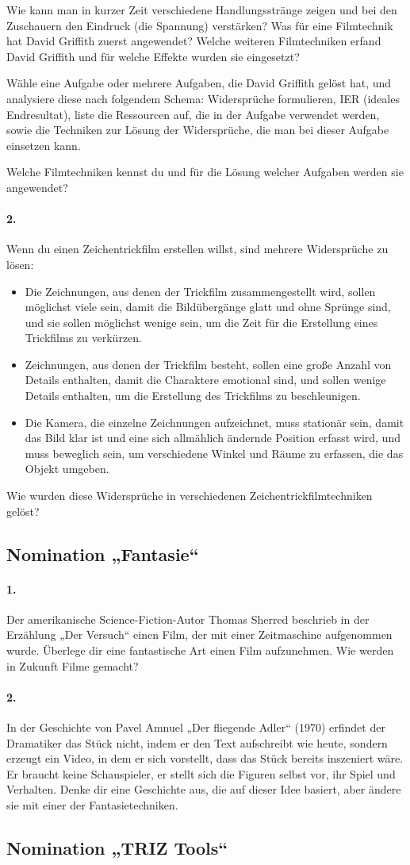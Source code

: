 \documentclass[11pt,a4paper]{article}
\newcommand{\contradictions}{
Wenn du einen Zeichentrickfilm erstellen willst, sind mehrere Widersprüche zu
lösen:
\begin {itemize}
\item Die Zeichnungen, aus denen der Trickfilm zusammengestellt wird, sollen
  möglichst viele sein, damit die Bildübergänge glatt und ohne Sprünge sind,
  und sie sollen möglichst wenige sein, um die Zeit für die Erstellung eines
  Trickfilms zu verkürzen.
\item Zeichnungen, aus denen der Trickfilm besteht, sollen eine große Anzahl
  von Details enthalten, damit die Charaktere emotional sind, und sollen
  wenige Details enthalten, um die Erstellung des Trickfilms zu beschleunigen.
\item Die Kamera, die einzelne Zeichnungen aufzeichnet, muss stationär sein,
  damit das Bild klar ist und eine sich allmählich ändernde Position erfasst
  wird, und muss beweglich sein, um verschiedene Winkel und Räume zu erfassen,
  die das Objekt umgeben.
\end{itemize}
Wie wurden diese Widersprüche in verschiedenen Zeichentrickfilmtechniken
gelöst?
}
\begin{document}
Wie kann man in kurzer Zeit verschiedene Handlungsstränge zeigen und bei den
Zuschauern den Eindruck (die Spannung) verstärken? Was für eine Filmtechnik
hat David Griffith zuerst angewendet? Welche weiteren Filmtechniken erfand
David Griffith und für welche Effekte wurden sie eingesetzt?

Wähle eine Aufgabe oder mehrere Aufgaben, die David Griffith gelöst hat, und
analysiere diese nach folgendem Schema: Widersprüche formulieren, IER (ideales
Endresultat), liste die Ressourcen auf, die in der Aufgabe verwendet werden,
sowie die Techniken zur Lösung der Widersprüche, die man bei dieser Aufgabe
einsetzen kann.

Welche Filmtechniken kennst du und für die Lösung welcher Aufgaben werden sie
angewendet?

\paragraph{2.}
\contradictions

\subsection*{Nomination „Fantasie“}

\paragraph{1.}
Der amerikanische Science-Fiction-Autor Thomas Sherred beschrieb in der
Erzählung „Der Versuch“ einen Film, der mit einer Zeitmaschine aufgenommen
wurde.  Überlege dir eine fantastische Art einen Film aufzunehmen. Wie werden
in Zukunft Filme gemacht?

\paragraph{2.}
In der Geschichte von Pavel Amnuel „Der fliegende Adler“ (1970) erfindet der
Dramatiker das Stück nicht, indem er den Text aufschreibt wie heute, sondern
erzeugt ein Video, in dem er sich vorstellt, dass das Stück bereits inszeniert
wäre. Er braucht keine Schauspieler, er stellt sich die Figuren selbst vor,
ihr Spiel und Verhalten. Denke dir eine Geschichte aus, die auf dieser Idee
basiert, aber ändere sie mit einer der Fantasietechniken.

\subsection*{Nomination „TRIZ Tools“}
\end{document}
